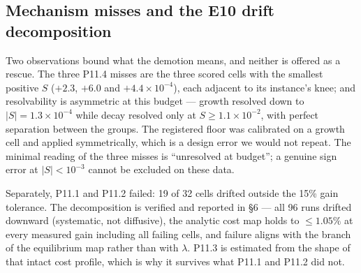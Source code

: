 \subsection{Mechanism misses and the E10 drift decomposition}
\label{app:mechanism}\label{app:drift}
Two observations bound what the demotion means, and neither is offered
as a rescue. The three P11.4 misses are the three scored cells with the
smallest positive \(S\) (\(+2.3\), \(+6.0\) and
\(+4.4 \times 10^{-4}\)), each adjacent to its instance's knee; and
resolvability is asymmetric at this budget --- growth resolved down to
\(|S| = 1.3\times10^{-4}\) while decay resolved only at
\(S \geq 1.1\times10^{-2}\), with perfect separation between the groups.
The registered floor was calibrated on a growth cell and applied
symmetrically, which is a design error we would not repeat. The minimal
reading of the three misses is ``unresolved at budget''; a genuine sign
error at \(|S| < 10^{-3}\) cannot be excluded on these data.

Separately, P11.1 and P11.2 failed: 19 of 32 cells drifted outside the
15\% gain tolerance. The decomposition is verified and reported in \S6
--- all 96 runs drifted downward (systematic, not diffusive), the
analytic cost map holds to \(\leq 1.05\%\) at every measured gain
including all failing cells, and failure aligns with the branch of the
equilibrium map rather than with \(\lambda\). P11.3 is estimated from
the shape of that intact cost profile, which is why it survives what
P11.1 and P11.2 did not.



